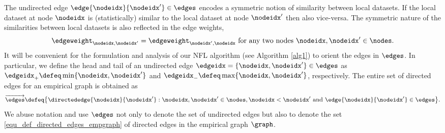 \documentclass[lettersize,journal]{IEEEtran}
\begin{document}
The undirected edge $\edge{\nodeidx}{\nodeidx'} \in \edges$ encodes a symmetric notion of similarity 
between local datasets. If the local dataset at node $\nodeidx$ is (statistically) similar to the local 
dataset at node $\nodeidx'$ then also vice-versa. The symmetric nature of the similarities between 
local datasets is also reflected in the edge weights, 
\vspace{-2mm}
$$\edgeweight_{\nodeidx,\nodeidx'} = \edgeweight_{\nodeidx', \nodeidx} \mbox{ for any two nodes } \nodeidx, \nodeidx' \in \nodes. \vspace{-2mm}$$
It will be convenient for the formulation and analysis of our NFL algorithm (see Algorithm \ref{alg1}) 
to orient the edges in $\edges$. 
In particular, we define the head and tail of an undirected edge $\edgeidx=\{\nodeidx,\nodeidx'\} \in \edges$ 
as $\edgeidx_{+} \defeq \min\{\nodeidx,\nodeidx'\}$ and $\edgeidx_{-} \defeq \max\{\nodeidx,\nodeidx'\}$, respectively. 
The entire set of directed edges for an empirical graph is obtained as  
\begin{equation} 
	\label{equ_def_directed_edges_empgraph}
\overrightarrow{\edges} \defeq \big\{\directededge{\nodeidx}{\nodeidx'}: \nodeidx,\nodeidx' \in \nodes, \nodeidx < \nodeidx' \mbox{ and } \edge{\nodeidx}{\nodeidx'} \in \edges \big\}. 
\end{equation} 
We abuse notation and use $\edges$ not only to denote the set of undirected edges but 
also to denote the set \eqref{equ_def_directed_edges_empgraph} of directed edges in the empirical graph $\graph$. 
 
\end{document}
